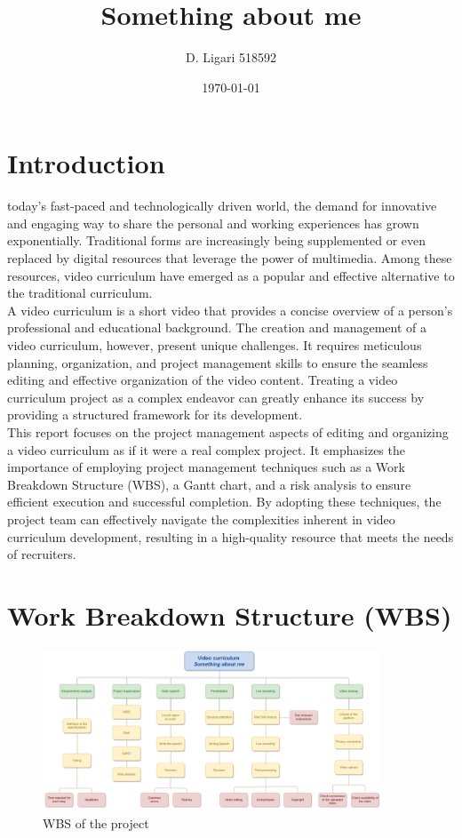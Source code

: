 \documentclass[eng]{class}
\title{Something about me}
\author{D. Ligari 518592}
\affil{Digital content retrieval, University of Pavia, Department of Computer Engineering (Data Science), Pavia, Italy}
\date{\today}
\begin{document}
\maketitle
\tableofcontents
\thispagestyle{FirstPage}
\section{Introduction}
today's fast-paced and technologically driven world, the demand for innovative and engaging way to share the personal and working experiences has grown exponentially.
Traditional forms are increasingly being supplemented or even replaced by digital resources that leverage the power of multimedia.
Among these resources, video curriculum have emerged as a popular and effective alternative to the traditional curriculum.\\
A video curriculum is a short video that provides a concise overview of a person's professional and educational background.
The creation and management of a video curriculum, however, present unique challenges.
It requires meticulous planning, organization, and project management skills to ensure the seamless editing and effective organization of the video content.
Treating a video curriculum project as a complex endeavor can greatly enhance its success by providing a structured framework for its development.\\
This report focuses on the project management aspects of editing and organizing a video curriculum as if it were a real complex project.
It emphasizes the importance of employing project management techniques such as a Work Breakdown Structure (WBS), a Gantt chart,
and a risk analysis to ensure efficient execution and successful completion. By adopting these techniques,
the project team can effectively navigate the complexities inherent in video curriculum development,
resulting in a high-quality resource that meets the needs of recruiters.
\section{Work Breakdown Structure (WBS)}
\pagestyle{OtherPage}

\begin{figure}[h!]
  \centering
  \includegraphics[width=0.9\textwidth]{images/wbs.png}
  \caption{WBS of the project}
  \label{fig-1}
\end{figure}
\end{document}
